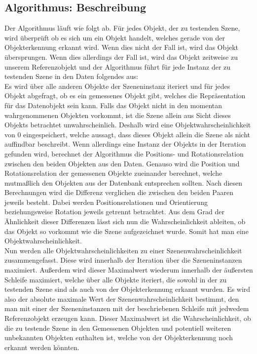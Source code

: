 \subsection{Algorithmus: Beschreibung}
Der  Algorithmus läuft wie folgt ab. Für jedes Objekt, der zu testenden  Szene, wird überprüft ob es sich um ein Objekt handelt, welches gerade von der Objekterkennung erkannt wird. Wenn dies nicht der Fall ist, wird das Objekt übersprungen. Wenn dies allerdings der Fall ist, wird das Objekt zeitweise zu unserem Referenzobjekt und der Algorithmus führt für jede Instanz der zu testenden Szene in den Daten folgendes aus:\smallskip\\
 Es wird über alle anderen Objekte der Szeneninstanz iteriert und für jedes Objekt abgefragt, ob es ein gemessenes Objekt gibt, welches die Repräsentation für das Datenobjekt sein kann. Falls das Objekt nicht in den momentan wahrgenommenen Objekten vorkommt, ist die Szene allein aus Sicht dieses Objekts betrachtet unwahrscheinlich. Deshalb wird eine Objektwahrscheinlichkeit von 0 eingespeichert, welche aussagt, dass dieses Objekt allein die Szene als nicht auffindbar beschreibt. Wenn allerdings eine Instanz der Objekts in der Iteration gefunden wird, berechnet der Algorithmus die Positions- und Rotationsrelation zwischen den beiden Objekten aus den Daten. Genauso wird die Position und Rotationsrelation der gemessenen Objekte zueinander berechnet, welche mutmaßlich den Objekten aus der Datenbank entsprechen sollten. Nach diesen Berechnungen wird die Differenz verglichen die zwischen den beiden Paaren jeweils besteht. Dabei werden Positionsrelationen und Orientierung beziehungsweise Rotation jeweils getrennt betrachtet. Aus dem Grad der Ähnlichkeit dieser Differenzen lässt sich nun die Wahrscheinlichkeit ableiten, ob das Objekt so vorkommt wie die Szene aufgezeichnet wurde. Somit hat man eine Objektwahrscheinlichkeit.\smallskip\\
Nun werden alle Objektwahrscheinlichkeiten zu einer Szenenwahrscheinlichkeit zusammengefasst. Diese wird innerhalb der Iteration über die Szeneninstanzen maximiert. Außerdem wird dieser Maximalwert wiederum innerhalb der äußersten Schleife maximiert, welche über alle Objekte iteriert, die sowohl in der zu testenden Szene sind als auch von der Objekterkennung erkannt wurden.  Es wird also der absolute maximale Wert der Szenenwahrscheinlichkeit bestimmt, den man mit einer der Szeneninstanzen mit der beschriebenen Schleife mit jedwedem Referenzobjekt erzeugen kann. Dieser Maximalwert ist die Wahrscheinlichkeit, ob die zu testende Szene in den Gemessenen Objekten und potentiell weiteren unbekannten Objekten enthalten ist, welche von der Objekterkennung noch erkannt werden könnten.\smallskip\\

